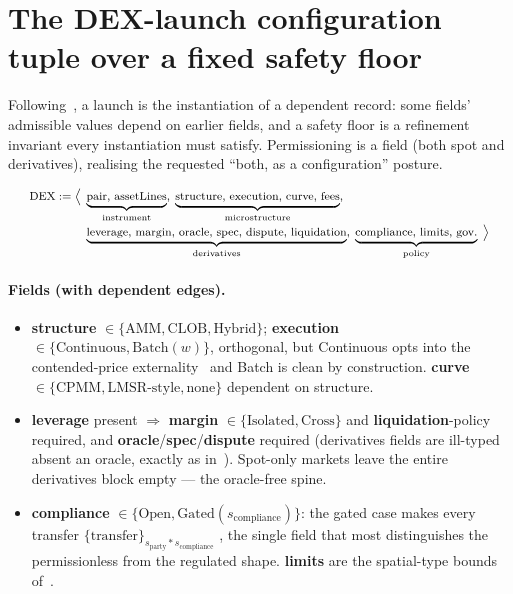\documentclass[11pt]{article}
\theoremstyle{definition}
\newcommand{\tensorsig}{\ensuremath{\ast}}
\begin{document}
\section{The DEX-launch configuration tuple over a fixed safety floor}\label{sec:tuple}

Following~\cite[\S5]{predmkt}, a launch is the instantiation of a dependent record: some fields'
admissible values depend on earlier fields, and a safety floor is a refinement invariant every
instantiation must satisfy. Permissioning is a field (both spot and derivatives), realising the
requested ``both, as a configuration'' posture.

\[
\footnotesize
\begin{aligned}
\mathrm{DEX} := \big\langle\;
&\underbrace{\text{pair, assetLines}}_{\text{instrument}},\;
\underbrace{\text{structure, execution, curve, fees}}_{\text{microstructure}},\\[-2pt]
&\underbrace{\text{leverage, margin, oracle, spec, dispute, liquidation}}_{\text{derivatives}},\;
\underbrace{\text{compliance, limits, gov.}}_{\text{policy}}
\;\big\rangle
\end{aligned}
\]

\paragraph{Fields (with dependent edges).}
\begin{itemize}[leftmargin=1.4em]
\item \textbf{structure} $\in \{\text{AMM}, \text{CLOB}, \text{Hybrid}\}$; \textbf{execution}
$\in \{\text{Continuous}, \text{Batch}(w)\}$, orthogonal, but Continuous opts into the contended-price
externality~\cite[\S6.2]{predmkt} and Batch is clean by construction. \textbf{curve} $\in
\{\text{CPMM}, \text{LMSR-style}, \text{none}\}$ dependent on structure.
\item \textbf{leverage} present $\Rightarrow$ \textbf{margin} $\in \{\text{Isolated}, \text{Cross}\}$
and \textbf{liquidation}-policy required, and \textbf{oracle}/\textbf{spec}/\textbf{dispute} required
(derivatives fields are ill-typed absent an oracle, exactly as in~\cite[\S5.2]{predmkt}). Spot-only
markets leave the entire derivatives block empty --- the oracle-free spine.
\item \textbf{compliance} $\in \{\text{Open}, \text{Gated}(s_{\text{compliance}})\}$: the gated case
makes every transfer $\{\text{transfer}\}_{s_{\text{party}} \tensorsig s_{\text{compliance}}}$
\cite[\S2.4]{cost}, the single field that most distinguishes the permissionless from the regulated
shape. \textbf{limits} are the spatial-type bounds of~\cite[\S8]{finrho}.
\end{itemize}
\end{document}
